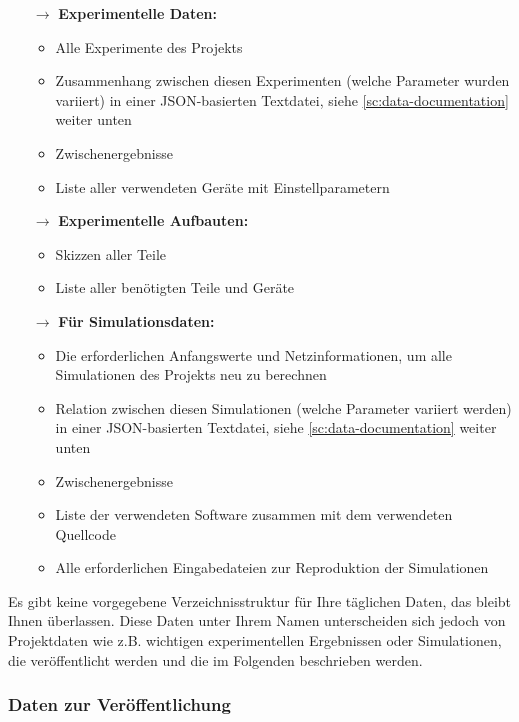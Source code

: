 \begin{itemize}
  \item[$\rightarrow$] \textbf{Experimentelle Daten:}
    \begin{itemize}
      \item Alle Experimente des Projekts
      \item Zusammenhang zwischen diesen Experimenten (welche Parameter wurden
            variiert) in einer JSON-basierten Textdatei, siehe
            \autoref{sc:data-documentation} weiter unten
      \item Zwischenergebnisse
      \item Liste aller verwendeten Geräte mit Einstellparametern
    \end{itemize}
  \item[$\rightarrow$] \textbf{Experimentelle Aufbauten:}
    \begin{itemize}
      \item Skizzen aller Teile
      \item Liste aller benötigten Teile und Geräte
    \end{itemize}
  \item[$\rightarrow$] \textbf{Für Simulationsdaten:}
    \begin{itemize}
      \item Die erforderlichen Anfangswerte und Netzinformationen, um alle
            Simulationen des Projekts neu zu berechnen
      \item Relation zwischen diesen Simulationen (welche Parameter variiert
            werden) in einer JSON-basierten Textdatei, siehe
            \autoref{sc:data-documentation} weiter unten
      \item Zwischenergebnisse
      \item Liste der verwendeten Software zusammen mit dem verwendeten Quellcode
      \item Alle erforderlichen Eingabedateien zur Reproduktion der Simulationen
    \end{itemize}
\end{itemize}

\noindent Es gibt keine vorgegebene Verzeichnisstruktur für Ihre täglichen
Daten, das bleibt Ihnen überlassen. Diese Daten unter Ihrem Namen unterscheiden
sich jedoch von Projektdaten wie z.B. wichtigen experimentellen Ergebnissen oder
Simulationen, die veröffentlicht werden und die im Folgenden beschrieben werden.

\subsubsection{Daten zur Veröffentlichung}\label{ssc:data-for-publication}

